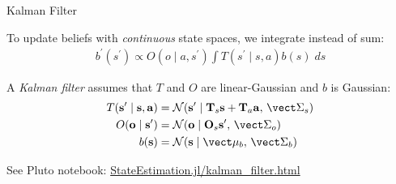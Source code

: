 \begin{frame}[fragile]{Kalman Filter}

To update beliefs with \textit{continuous} state spaces, we integrate instead of sum:
\begin{gather*}
    b^\prime(s^\prime) \propto O(o \mid a, s^\prime)\int T(s^\prime \mid s, a)b(s)\;ds    
\end{gather*}

A \textit{Kalman filter} assumes that $T$ and $O$ are linear-Gaussian and $b$ is Gaussian:
\begin{align*}
    T(\mathbf{s}^\prime \mid \mathbf s, \mathbf a) &= \mathcal{N}(\mathbf{s}^\prime \mid \mathbf{T}_s \mathbf{s} + \mathbf{T}_a \mathbf{a},\, \mat{\Sigma}_s)\\
    O(\mathbf o \mid \mathbf{s}^\prime) &= \mathcal{N}(\mathbf o \mid \mathbf{O}_s \mathbf{s}^\prime,\, \mat{\Sigma}_o)\\
    b(\mathbf{s}) &= \mathcal{N}(\mathbf{s} \mid \vec{\mu}_b,\, \mat{\Sigma}_b)
\end{align*}


See Pluto notebook: \href{http://htmlpreview.github.io/?https://raw.githubusercontent.com/mossr/StateEstimation.jl/master/html/kalman_filter.html}{\color{cardinal}StateEstimation.jl/kalman\_filter.html}

\end{frame}